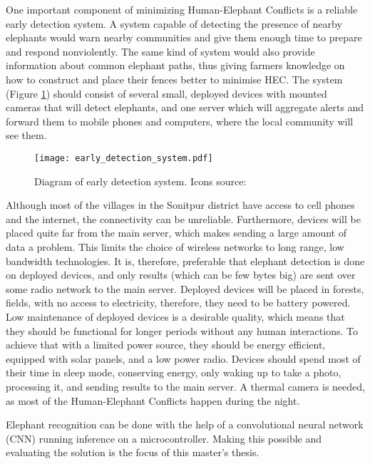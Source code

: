 One important component of minimizing Human-Elephant Conflicts is a reliable early detection system. 
A system capable of detecting the presence of nearby elephants would warn nearby communities and give them enough time to prepare and respond nonviolently.
The same kind of system would also provide information about common elephant paths, thus giving farmers knowledge on how to construct and place their fences better to minimise HEC.
The system (Figure \ref{early_detection_system_diagram}) should consist of several small, deployed devices with mounted cameras that will detect elephants, and one server which will aggregate alerts and forward them to mobile phones and computers, where the local community will see them.

\begin{figure}[ht]
        \centering
        \texttt{[image: early\_detection\_system.pdf]} 
        \caption[Diagram of early detection system.]{Diagram of early detection system. Icons source:\cite{icons}}
        \label{early_detection_system_diagram}
\end{figure}

Although most of the villages in the Sonitpur district have access to cell phones and the internet, the connectivity can be unreliable\cite{wildlabs-elephants}. 
Furthermore, devices will be placed quite far from the main server, which makes sending a large amount of data a problem. 
This limits the choice of wireless networks to long range, low bandwidth technologies.
It is, therefore, preferable that elephant detection is done on deployed devices, and only results (which can be few bytes big) are sent over some radio network to the main server.
Deployed devices will be placed in forests, fields, with no access to electricity, therefore, they need to be battery powered.
Low maintenance of deployed devices is a desirable quality, which means that they should be functional for longer periods without any human interactions.
To achieve that with a limited power source, they should be energy efficient, equipped with solar panels, and a low power radio.
Devices should spend most of their time in sleep mode, conserving energy, only waking up to take a photo, processing it, and sending results to the main server.
A thermal camera is needed, as most of the Human-Elephant Conflicts happen during the night\cite{wildlabs-elephants}.

Elephant recognition can be done with the help of a convolutional neural network (CNN) running inference on a microcontroller. 
Making this possible and evaluating the solution is the focus of this master's thesis.


